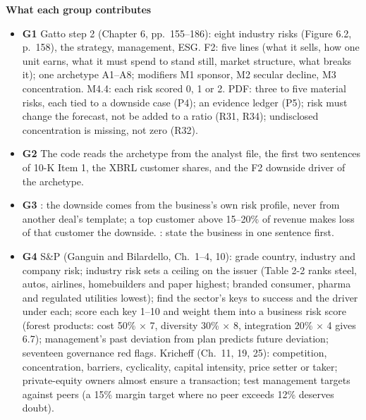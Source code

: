 \documentclass[11pt]{article}
\newcommand{\GA}{\textcolor{gA}{\textbf{G1}}}
\newcommand{\GB}{\textcolor{gB}{\textbf{G2}}}
\newcommand{\GC}{\textcolor{gC}{\textbf{G3}}}
\newcommand{\GD}{\textcolor{gD}{\textbf{G4}}}
\newcommand{\fld}[1]{\par\medskip\noindent\textbf{\textcolor{steel}{#1}}\par\nopagebreak}
\begin{document}
\fld{What each group contributes}
\begin{itemize}
\item \GA{} Gatto step 2 (Chapter 6, pp.~155--186): eight industry risks (Figure 6.2, p.~158), the strategy, management, ESG. F2: five lines (what it sells, how one unit earns, what it must spend to stand still, market structure, what breaks it); one archetype A1--A8; modifiers M1 sponsor, M2 secular decline, M3 concentration. M4.4: each risk scored 0, 1 or 2. PDF: three to five material risks, each tied to a downside case (P4); an evidence ledger (P5); risk must change the forecast, not be added to a ratio (R31, R34); undisclosed concentration is missing, not zero (R32).
\item \GB{} The code reads the archetype from the analyst file, the first two sentences of 10-K Item 1, the XBRL customer shares, and the F2 downside driver of the archetype.
\item \GC{} : the downside comes from the business's own risk profile, never from another deal's template; a top customer above 15--20\% of revenue makes loss of that customer the downside. : state the business in one sentence first.
\item \GD{} S\&P (Ganguin and Bilardello, Ch.~1--4, 10): grade country, industry and company risk; industry risk sets a ceiling on the issuer (Table 2-2 ranks steel, autos, airlines, homebuilders and paper highest; branded consumer, pharma and regulated utilities lowest); find the sector's keys to success and the driver under each; score each key 1--10 and weight them into a business risk score (forest products: cost 50\% $\times$ 7, diversity 30\% $\times$ 8, integration 20\% $\times$ 4 gives 6.7); management's past deviation from plan predicts future deviation; seventeen governance red flags. Kricheff (Ch.~11, 19, 25): competition, concentration, barriers, cyclicality, capital intensity, price setter or taker; private-equity owners almost ensure a transaction; test management targets against peers (a 15\% margin target where no peer exceeds 12\% deserves doubt).
\end{itemize}
\end{document}
